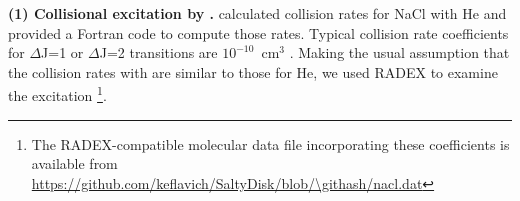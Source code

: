 \documentclass[twocolumn]{aastex62}
\newcommand{\rlp}[1]{\textcolor{red!65!black}{\textbf{[RLP: #1]}}}
\newcommand{\ag}[1]{\textcolor{red!65!black}{\textbf{[AG: #1]}}}
\begin{document}
\par{\textbf{(1) Collisional excitation by \hh.}} 
%
%
\citet{Quintana-Lacaci2016a} calculated collision rates for NaCl with He and
provided a Fortran code to compute those rates.  Typical collision rate
coefficients for \hbox{$\Delta$J=1} or \hbox{$\Delta$J=2} transitions are
$10^{-10}$~cm$^3$ \pers.  Making the usual assumption that the collision rates
with \hh are similar to those for He, we used RADEX \citep{van-der-Tak2007a} to
examine the excitation \footnote{The RADEX-compatible molecular data file
incorporating these coefficients is available from
\url{https://github.com/keflavich/SaltyDisk/blob/\githash/nacl.dat}}.
\end{document}
